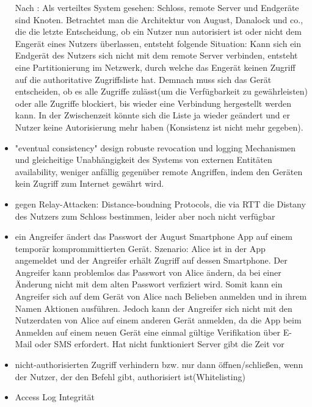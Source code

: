 \begin{itemize}
        Nach \citeauthor{Ho2016}:
        Als verteiltes System gesehen: Schloss, remote Server und Endgeräte sind Knoten.
        Betrachtet man die Architektur von August, Danalock und co., die die letzte Entscheidung, ob ein Nutzer nun autorisiert ist oder nicht dem Engerät eines Nutzers überlassen, entsteht folgende Situation:
        Kann sich ein Endgerät des Nutzers sich nicht mit dem remote Server verbinden, entsteht eine Partitionierung im Netzwerk, durch welche das Engerät keinen Zugriff auf die authoritative Zugriffsliste hat.
        Demnach muss sich das Gerät entscheiden, ob es alle Zugriffe zulässt(um die Verfügbarkeit zu gewährleisten) oder alle Zugriffe blockiert, bis wieder eine Verbindung hergestellt werden kann.
        In der Zwischenzeit könnte sich die Liste ja wieder geändert und er Nutzer keine Autorisierung mehr haben (Konsistenz ist nicht mehr gegeben).
        \item \textrightarrow "eventual consistency" design \textrightarrow robuste revocation und logging Mechanismen und gleicheitige Unabhängigkeit des Systems von externen Entitäten\cite{Ho2016} \textrightarrow availability, weniger anfällig gegenüber remote Angriffen, indem den Geräten kein Zugriff zum Internet gewährt wird.
        \item gegen Relay-Attacken: Distance-boudning Protocols, die via RTT die Distany des Nutzers zum Schloss bestimmen, leider aber noch nicht verfügbar\cite{Ho2016} \item ein Angreifer ändert das Passwort der August Smartphone App auf einem temporär komprommittierten Gerät.
	        Szenario: Alice ist in der App angemeldet und der Angreifer erhält Zugriff auf dessen Smartphone.
	        Der Angreifer kann problemlos das Passwort von Alice ändern, da bei einer Änderung nicht mit dem alten Passwort verfiziert wird.
	        Somit kann ein Angreifer sich auf dem Gerät von Alice nach Belieben anmelden und in ihrem Namen Aktionen ausführen.
	        Jedoch kann der Angreifer sich nicht mit den Nutzerdaten von Alice auf einem anderen Gerät anmelden, da die App beim Anmelden auf einem neuen Gerät eine einmal gültige Verifikation über E-Mail oder SMS erfordert.
	        Hat nicht funktioniert \textrightarrow Server gibt die Zeit vor \cite{Fuller2017}
        \item nicht-authorisierten Zugriff verhindern bzw. nur dann öffnen/schließen, wenn der Nutzer, der den Befehl gibt, authorisiert ist(Whitelisting) \cite{Ho2016}
        \item Access Log Integrität \cite{Ho2016}
    \end{itemize}
